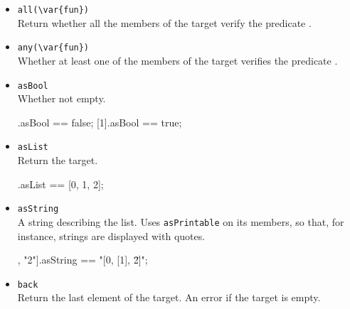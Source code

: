 \begin{itemize}
\item \lstinline|all(\var{fun})|\\
  Return whether all the members of the target verify the predicate
  .


\item \lstinline|any(\var{fun})|\\
  Whether at least one of the members of the target verifies the
  predicate .


\item \lstinline|asBool|\\
  Whether not empty.
\begin{urbiassert}
[].asBool == false;
[1].asBool == true;
\end{urbiassert}

\item \lstinline|asList|\\
Return the target.

\begin{urbiassert}
[0, 1, 2].asList == [0, 1, 2];
\end{urbiassert}

\item \lstinline|asString|\\
  A string describing the list.  Uses \lstinline|asPrintable| on its
  members, so that, for instance, strings are displayed with quotes.

\begin{urbiassert}
[0, [1], "2"].asString == "[0, [1], \"2\"]";
\end{urbiassert}

\item \lstinline|back|\\
Return the last element of the target. An error if the target is empty.


\end{itemize}
